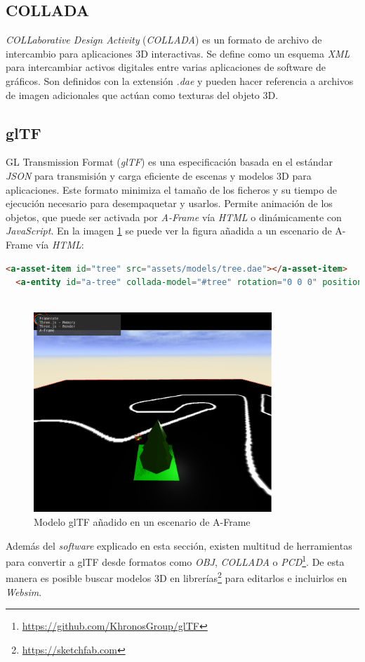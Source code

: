 \subsection{COLLADA}
\textit{COLLaborative Design Activity} (\textit{COLLADA}) es un  formato de archivo de intercambio para aplicaciones 3D interactivas. Se define como un esquema \textit{XML} para intercambiar activos digitales entre varias aplicaciones de software de gráficos. Son definidos con la extensión \textit{.dae} y pueden hacer referencia a archivos de imagen adicionales que actúan como texturas del objeto 3D. 

\subsection{glTF}
GL Transmission Format (\textit{glTF}) es una especificación basada en el estándar \textit{JSON} para transmisión y carga eficiente de escenas y modelos 3D para aplicaciones. Este formato minimiza el tamaño de los ficheros y su tiempo de ejecución necesario para desempaquetar y usarlos. Permite animación de los objetos, que puede ser activada por \textit{A-Frame} vía \textit{HTML} o dinámicamente con \textit{JavaScript}. 
En la imagen \ref{fig:tree} se puede ver la figura añadida a un escenario de A-Frame vía \textit{HTML}:

\begin{lstlisting}[language=html, caption=Código para añadir un modelo 3D personalizado a A-Frame]
 <a-asset-item id="tree" src="assets/models/tree.dae"></a-asset-item>
  <a-entity id="a-tree" collada-model="#tree" rotation="0 0 0" position="2.75 0.01 -2.27">
  
\end{lstlisting}

\begin{figure}[H]
\centering
\includegraphics[width=0.8\textwidth]{img/tree_aframe.png}
\caption{Modelo glTF añadido en un escenario de A-Frame} \label{fig:tree}
\end{figure}
Además del \textit{software} explicado en esta sección, existen multitud de herramientas para convertir a glTF desde formatos como \textit{OBJ}, \textit{COLLADA} o  \textit{PCD}\footnote{\url{https://github.com/KhronosGroup/glTF}}. De esta manera es posible buscar modelos 3D en librerías\footnote{\url{https://sketchfab.com}} para editarlos e incluirlos en \textit{Websim}.

